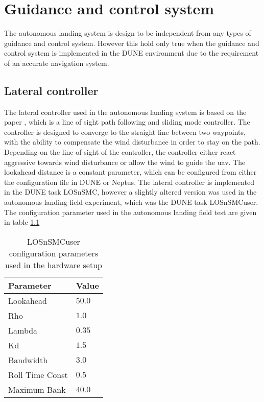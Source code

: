 \chapter{Guidance and control system}\label{AP:ControlGuidanceSystem}
The autonomous landing system is design to be independent from any types of guidance and control system. However this hold only true when the guidance and control system is implemented in the DUNE environment due to the requirement of an accurate navigation system. 
\section{Lateral controller}
The lateral controller used in the autonomous landing system is based on the paper \citep{fortuna2015cascaded}, which is a line of sight path following and sliding mode controller. The controller is designed to converge to the straight line between two waypoints, with the ability to compensate the wind disturbance in order to stay on the path. Depending on the line of sight of the controller, the controller either react aggressive towards wind disturbance or allow the wind to guide the \gls{uav}. The lookahead distance is a constant parameter, which can be configured from either the configuration file in DUNE or Neptus. The lateral controller is implemented in the DUNE task LOSnSMC, however a slightly altered version was used in the autonomous landing field experiment, which was the DUNE task LOSnSMCuser. The configuration parameter used in the autonomous landing field test are given in table \ref{AP:TB:LOSnSMCuser} 

\begin{table}[H]
\centering
\begin{tabular}{| l | l |}
\hline
\textbf{Parameter}	&	\textbf{Value} \\ \hline
Lookahead           &                    $50.0$ \\ \hline
Rho                 &                    $1.0$ \\ \hline
Lambda				&                    $0.35$ \\ \hline
Kd					&                    $1.5$ \\ \hline
Bandwidth			&                    $3.0$ \\ \hline
Roll Time Const		&                    $0.5$ \\ \hline
Maximum Bank		&                    $40.0$ \\ \hline
\end{tabular}
\caption{LOSnSMCuser configuration parameters used in the hardware setup}
\label{AP:TB:LOSnSMCuser}
\end{table}
